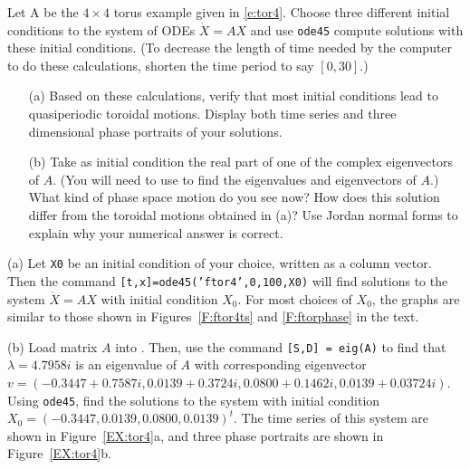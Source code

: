 \documentclass{ximera}
\begin{document}
\begin{exercise}  \label{EX:tor4}
Let A be the $4\times 4$ torus example given in \eqref{e:tor4}.  Choose three 
different initial conditions to the system of ODEs $\dot{X}=AX$ and use 
{\tt ode45} compute solutions with these initial conditions.  (To decrease 
the length of time needed by the computer to do these calculations, shorten 
the time period to say $[0,30]$.)  
\begin{itemize}
\item[(a)]  Based on these calculations, verify that most initial conditions 
lead to quasiperiodic toroidal motions.  Display both time series and 
three dimensional phase portraits of your solutions. 
\item[(b)]  Take as initial condition the real part of one of the complex
eigenvectors of $A$.  (You will need to use \Matlab to find the eigenvalues
and eigenvectors of $A$.)  What kind of phase space motion do you see now? 
How does this solution differ from the toroidal motions obtained in (a)? 
Use Jordan normal forms to explain why your numerical answer is correct.
\end{itemize}

\begin{solution}

(a) Let {\tt X0} be an initial condition of your choice, written as a
column vector.  Then the command {\tt [t,x]=ode45('ftor4',0,100,X0)}
will find solutions to the system $\dot{X} = AX$ with initial condition
$X_0$.  For most choices of $X_0$, the graphs are similar to those shown
in Figures~\ref{F:ftor4ts} and \ref{F:ftorphase} in the text.

(b) Load matrix $A$ into \Matlabp.  Then, use the command
{\tt [S,D] = eig(A)} to find that $\lambda = 4.7958i$ is an eigenvalue of
$A$ with corresponding eigenvector $v = (-0.3447 + 0.7587i, 0.0139 +
0.3724i, 0.0800 + 0.1462i, 0.0139 + 0.03724i)$.  Using {\tt ode45}, find
the solutions to the system with initial condition $X_0 = (-0.3447, 0.0139,
0.0800, 0.0139)^t$.  The time series of this system are shown in
Figure~\ref{EX:tor4}a, and three phase portraits are shown in
Figure~\ref{EX:tor4}b.

\begin{figure}[htb]
                       \centerline{%
			\hspace{1.0in}
                       }
\end{figure}

\end{solution}
\end{exercise} 
\end{document}
